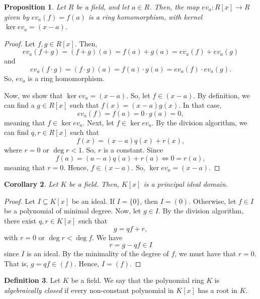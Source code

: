 \documentclass[a4paper, openany]{memoir}
\theoremstyle{definition}
\newtheorem{definition}{Definition}[section]
\theoremstyle{plain}
\newtheorem{proposition}[definition]{Proposition}
\newtheorem{corollary}[definition]{Corollary}
\begin{document}
    \begin{proposition}
        Let $R$ be a field, and let $a \in R$. Then, the map $ev_a \colon R[x] \to R$ given by $ev_a(f) = f(a)$ is a ring homomorphism, with kernel $\ker ev_a = (x - a)$.
    \end{proposition}
    \begin{proof}
        Let $f, g \in R[x]$. Then,
        \[ev_a(f + g) = (f + g)(a) = f(a) + g(a) = ev_a(f) + ev_a(g)\]
        and
        \[ev_a(f \cdot g) = (f \cdot g)(a) = f(a) \cdot g(a) = ev_a(f) \cdot ev_a(g).\]
        So, $ev_a$ is a ring homomorphism.

        Now, we show that $\ker ev_a = (x - a)$. So, let $f \in (x - a)$. By definition, we can find a $g \in R[x]$ such that $f(x) = (x - a)g(x)$. In that case,
        \[ev_a(f) = f(a) = 0 \cdot g(a) = 0,\]
        meaning that $f \in \ker ev_a$. Next, let $f \in \ker ev_a$. By the division algorithm, we can find $q, r \in R[x]$ such that 
        \[f(x) = (x - a) q(x) + r(x),\]
        where $r = 0$ or $\deg r < 1$. So, $r$ is a constant. Since 
        \[f(a) = (a - a) q(a) + r(a) \iff 0 = r(a),\]
        meaning that $r = 0$. Hence, $f \in (x - a)$. So, $\ker ev_a = (x - a)$.
    \end{proof}
    
    \begin{corollary}
        Let $K$ be a field. Then, $K[x]$ is a principal ideal domain.
    \end{corollary}
    \begin{proof}
        Let $I \subseteq K[x]$ be an ideal. If $I = \{0\}$, then $I = (0)$. Otherwise, let $f \in I$ be a polynomial of minimal degree. Now, let $g \in I$. By the division algorithm, there exist $q, r \in K[x]$ such that
        \[g = qf + r,\]
        with $r = 0$ or $\deg r < \deg f$. We have
        \[r = g - qf \in I\]
        since $I$ is an ideal. By the minimality of the degree of $f$, we must have that $r = 0$. That is, $g = qf \in (f)$. Hence, $I = (f)$.
    \end{proof}

    \begin{definition}
        Let $K$ be a field. We say that the polynomial ring $K$ is \emph{algebraically closed} if every non-constant polynomial in $K[x]$ has a root in $K$.
    \end{definition}
\end{document}
